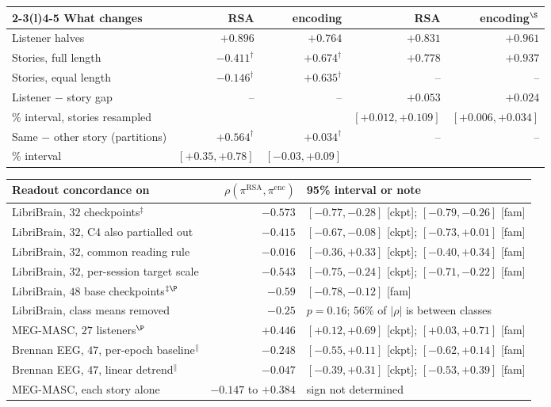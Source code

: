 \documentclass{article}
\begin{document}
\begin{table}[t]
\begin{tabular}{@{}lrrrr@{}}
\cmidrule(lr){2-3}\cmidrule(l){4-5}
What changes & RSA & encoding & RSA & encoding$^\S$ \\
\midrule
Listener halves & $+0.896$ & $+0.764$ & $+0.831$ & $+0.961$ \\
Stories, full length & $-0.411^\dagger$ & $+0.674^\dagger$ & $+0.778$ & $+0.937$ \\
Stories, equal length & $-0.146^\dagger$ & $+0.635^\dagger$ & -- & -- \\
Listener $-$ story gap & -- & -- & $+0.053$ & $+0.024$ \\
\quad 95\% interval, stories resampled & & & {\scriptsize $[+0.012,+0.109]$} & {\scriptsize $[+0.006,+0.034]$} \\
Same $-$ other story (partitions) & $+0.564^\dagger$ & $+0.034^\dagger$ & -- & -- \\
\quad 95\% interval & {\scriptsize $[+0.35,+0.78]$} & {\scriptsize $[-0.03,+0.09]$} & & \\
\bottomrule
\end{tabular}

\vspace{0.6ex}
\begin{tabular}{@{}lrl@{}}
\toprule
Readout concordance on & $\rho(\pi^{\mathrm{RSA}},\pi^{\mathrm{enc}})$ & 95\% interval or note \\
\midrule
LibriBrain, $32$ checkpoints$^\ddagger$ & $-0.573$ & {\scriptsize $[-0.77,-0.28]$ [ckpt]; $[-0.79,-0.26]$ [fam]} \\
LibriBrain, $32$, C4 also partialled out & $-0.415$ & {\scriptsize $[-0.67,-0.08]$ [ckpt]; $[-0.73,+0.01]$ [fam]} \\
LibriBrain, $32$, common reading rule & $-0.016$ & {\scriptsize $[-0.36,+0.33]$ [ckpt]; $[-0.40,+0.34]$ [fam]} \\
LibriBrain, $32$, per-session target scale & $-0.543$ & {\scriptsize $[-0.75,-0.24]$ [ckpt]; $[-0.71,-0.22]$ [fam]} \\
LibriBrain, $48$ base checkpoints$^{\ddagger\P}$ & $-0.59$ & {\scriptsize $[-0.78,-0.12]$ [fam]} \\
LibriBrain, class means removed & $-0.25$ & $p=0.16$; $56\%$ of $|\rho|$ is between classes \\
MEG-MASC, $27$ listeners$^\P$ & $+0.446$ & {\scriptsize $[+0.12,+0.69]$ [ckpt]; $[+0.03,+0.71]$ [fam]} \\
Brennan EEG, $47$, per-epoch baseline$^\|$ & $-0.248$ & {\scriptsize $[-0.55,+0.11]$ [ckpt]; $[-0.62,+0.14]$ [fam]} \\
Brennan EEG, $47$, linear detrend$^\|$ & $-0.047$ & {\scriptsize $[-0.39,+0.31]$ [ckpt]; $[-0.53,+0.39]$ [fam]} \\
MEG-MASC, each story alone & $-0.147$ to $+0.384$ & sign not determined \\
\bottomrule
\end{tabular}
\end{table}
\end{document}
